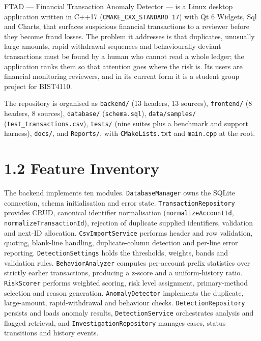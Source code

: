 \documentclass[
  12pt,
]{report}
\begin{document}
FTAD --- Financial Transaction Anomaly Detector --- is a Linux desktop
application written in C++17 (\texttt{CMAKE\_CXX\_STANDARD\ 17}) with Qt
6 Widgets, Sql and Charts, that surfaces suspicious financial
transactions to a reviewer before they become fraud losses. The problem
it addresses is that duplicates, unusually large amounts, rapid
withdrawal sequences and behaviourally deviant transactions must be
found by a human who cannot read a whole ledger; the application ranks
them so that attention goes where the risk is. Its users are financial
monitoring reviewers, and in its current form it is a student group
project for BIST4110.

The repository is organised as \texttt{backend/\allowbreak{}} (13 headers, 13
sources), \texttt{frontend/\allowbreak{}} (8 headers, 8 sources), \texttt{database/\allowbreak{}}
(\texttt{schema.sql}), \texttt{data/\allowbreak{}samples/\allowbreak{}}
(\texttt{test\_transactions.csv}), \texttt{tests/\allowbreak{}} (nine suites plus a
benchmark and support harness), \texttt{docs/\allowbreak{}}, and \texttt{Reports/\allowbreak{}},
with \texttt{CMakeLists.txt} and \texttt{main.cpp} at the root.

\section{1.2 Feature Inventory}\label{feature-inventory}

The backend implements ten modules. \texttt{DatabaseManager} owns the
SQLite connection, schema initialisation and error state.
\texttt{Transaction\-Repository} provides CRUD, canonical identifier
normalisation (\texttt{normalize\-Account\-Id},
\texttt{normalize\-Transaction\-Id}), rejection of duplicate supplied
identifiers, validation and next-ID allocation.
\texttt{Csv\-Import\-Service} performs header and row validation, quoting,
blank-line handling, duplicate-column detection and per-line error
reporting. \texttt{Detection\-Settings} holds the thresholds, weights,
bands and validation rules. \texttt{Behavior\-Analyzer} computes
per-account prefix statistics over strictly earlier transactions,
producing a z-score and a uniform-history ratio. \texttt{RiskScorer}
performs weighted scoring, risk level assignment, primary-method
selection and reason generation. \texttt{AnomalyDetector} implements the
duplicate, large-amount, rapid-withdrawal and behaviour checks.
\texttt{Detection\-Repository} persists and loads anomaly results,
\texttt{Detection\-Service} orchestrates analysis and flagged retrieval,
and \texttt{Investigation\-Repository} manages cases, status transitions
and history events.
\end{document}

